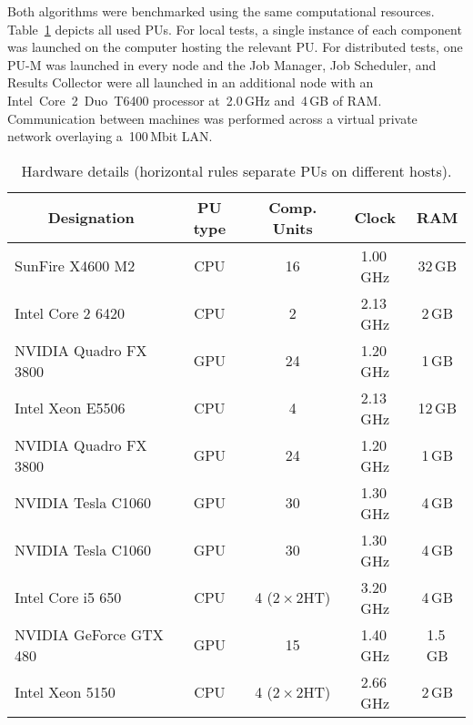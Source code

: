 \documentclass[runningheads,a4paper]{llncs}
\begin{document}
Both algorithms were benchmarked using the same computational resources. Table~\ref{tab:PUs} depicts all used PUs. For local tests, a single instance of each component was launched on the computer hosting the relevant PU\@. For distributed tests, one PU-M was launched in every node and the Job Manager, Job Scheduler, and Results Collector were all launched in an additional node with an \mbox{Intel}~Core~2~Duo~T6400 processor at~2.0$\,$GHz and~4$\,$GB of RAM. Communication between machines was performed across a virtual private network overlaying a~100$\,$Mbit LAN.

\begin{table}
  \centering
  \caption{Hardware details (horizontal rules separate PUs on different hosts).}
    \begin{tabular*}{0.95\linewidth}{@{\extracolsep{\fill}} l  c  c  c  c}
      \multicolumn{1}{c}{\textbf{Designation}} & \textbf{PU type} & \textbf{Comp. Units\footnotemark[1]} & \textbf{Clock} & \textbf{RAM}\\
      \toprule
      SunFire X4600 M2      & CPU &  16 & 1.00$\,$GHz & 32$\,$GB \\
      \midrule
      Intel Core 2 6420      & CPU &  2 & 2.13$\,$GHz & 2$\,$GB \\%
      NVIDIA Quadro FX 3800  & GPU & 24 & 1.20$\,$GHz & 1$\,$GB \\
      \midrule
      Intel Xeon E5506       & CPU &  4 & 2.13$\,$GHz & 12$\,$GB\\%
      NVIDIA Quadro FX 3800         & GPU & 24 & 1.20$\,$GHz & 1$\,$GB\\
      NVIDIA Tesla C1060            & GPU & 30 & 1.30$\,$GHz & 4$\,$GB\\
      NVIDIA Tesla C1060            & GPU & 30 & 1.30$\,$GHz & 4$\,$GB\\
      \midrule
      Intel Core i5 650      & CPU &  4 ($2\times2$HT)\footnotemark[2] & 3.20$\,$GHz & 4$\,$GB\\%
      NVIDIA GeForce GTX 480 & GPU & 15 & 1.40$\,$GHz & 1.5$\,$GB\\
      \midrule
      Intel Xeon 5150 & CPU & 4 ($2\times2$HT)\footnotemark[2] & 2.66$\,$GHz & 2$\,$GB\\%
      \bottomrule
    \end{tabular*}

\begin{minipage}{\linewidth}
	\setcounter{mpfootnote}{1}
	\renewcommand{\thempfootnote}{\arabic{mpfootnote}}
	\renewcommand{\footnoterule}{}
	

\end{minipage}

  \label{tab:PUs}
\end{table}
\end{document}
